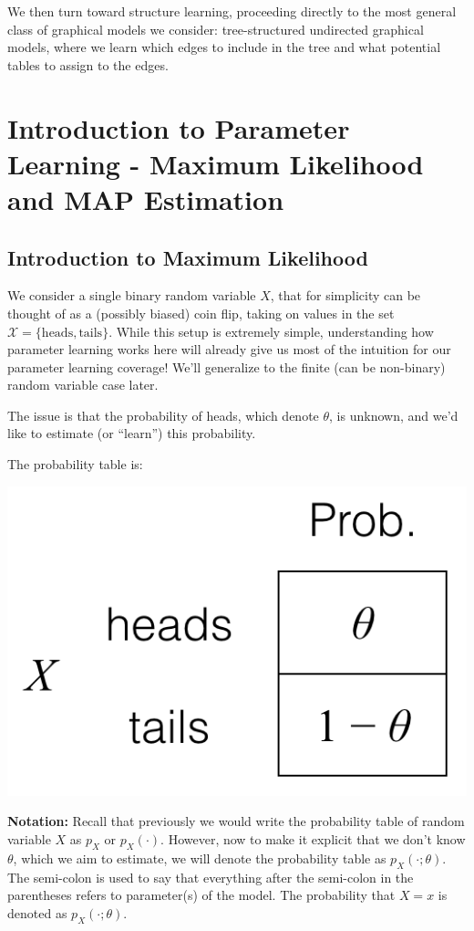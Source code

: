 \documentclass[6008notes.tex]{subfiles}
\begin{document}
We then turn toward structure learning, proceeding directly to the most general class of graphical models we consider: tree-structured undirected graphical models, where we learn which edges to include in the tree and what potential tables to assign to the edges.

\section{Introduction to Parameter Learning - Maximum Likelihood and MAP Estimation }

\subsection{Introduction to Maximum Likelihood}

We consider a single binary random variable $X$, that for simplicity can be thought of as a (possibly biased) coin flip, taking on values in the set $\mathcal{X}=\{ \text {heads},\text {tails}\}$. While this setup is extremely simple, understanding how parameter learning works here will already give us most of the intuition for our parameter learning coverage! We'll generalize to the finite (can be non-binary) random variable case later.

The issue is that the probability of heads, which denote $\theta$, is unknown, and we'd like to estimate (or ``learn'') this probability.

The probability table is:

{\centering\includegraphics[scale=0.4]{images_sec-maximum-likelihood-intro} \par}

\textbf{Notation:} Recall that previously we would write the probability table of random variable $X$ as $p_X$ or $p_X(\cdot)$. However, now to make it explicit that we don't know $\theta$, which we aim to estimate, we will denote the probability table as $p_{X}(\cdot ;\theta )$. The semi-colon is used to say that everything after the semi-colon in the parentheses refers to parameter(s) of the model. The probability that $X=x$ is denoted as $p_{X}(\cdot ;\theta )$.
\end{document}
